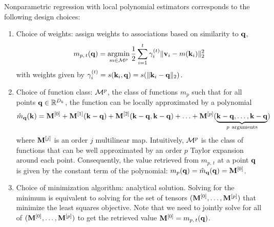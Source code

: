 \documentclass[notitlepage, 11pt]{article}
\newcommand*{\memory}{{m}}
\newcommand*{\dkey}{{D_k}}
\begin{document}
Nonparametric regression with local polynomial estimators corresponds to the following design choices:
\begin{enumerate}
    \item Choice of weights: assign weights to associations based on similarity to $\mathbf{q}$, 
    \begin{align} \memory_{p,\,t}(\qbf) = \argmin_{\memory\in \Mcal^p} \frac{1}{2}\sum_{i=1}^t \gamma_i^{(t)} \norm{\vbf_i - \memory(\kbf_i)}_2^2 \label{eqn:local-polynomial-loss}\end{align}
    with weights given by $\gamma_i^{(t)}=s(\mathbf{k}_i, \mathbf{q})=s(\lVert\mathbf{k}_i - \mathbf{q}\rVert_2)$.%
    \item Choice of function class:  $\mathcal{M}^p$, the class of functions $\memory_p$ such that for all points $\qbf\in \reals^\dkey$, the function can be locally approximated by a polynomial
        \begin{align}
            \hat{\memory}_\qbf(\kbf) = \Mbf^{[0]} + \Mbf^{[1]}(\kbf- \qbf) + \Mbf^{[2]}(\kbf - \qbf, \kbf - \qbf) + \ldots + \Mbf^{[p]}(\underbrace{\kbf - \qbf, \ldots, \kbf - \qbf}_{p\ \text{arguments}})\label{eqn:multivariate-polynomial}
        \end{align}
        where $\mathbf{M}^{[j]}$ is an order $j$ multilinear map.
        Intuitively, $\mathcal{M}^p$ is the class of functions that can be well approximated by an order $p$ Taylor expansion around each point.
        Consequently, the value retrieved from $\memory_{p,\, t}$ at a point $\mathbf{q}$ is given by the constant term of the polynomial: $\memory_{p}(\qbf) = \hat\memory_\qbf(\qbf) = \Mbf^{[0]}$.
    \item Choice of minimization algorithm: analytical solution.  Solving for the minimum is equivalent to solving for the set of tensors $(\mathbf{M}^{[0]}, \ldots, \mathbf{M}^{[p]})$ that minimize the least squares objective. Note that we need to jointly solve for all of $(\mathbf{M}^{[0]}, \ldots, \mathbf{M}^{[p]})$ to get the retrieved value $\Mbf^{[0]} = \memory_{p,\, t}(\qbf)$.
\end{enumerate}
\end{document}
